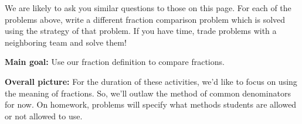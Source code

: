 \documentclass[nooutcomes,noauthor]{ximera}
\begin{document}
\begin{problem}
We are likely to ask you similar questions to those on this page. For each of the problems above, write a different fraction comparison problem which is solved using the strategy of that problem. If you have time, trade problems with a neighboring team and solve them!
\end{problem}





\newpage

\begin{instructorNotes} 



{\bf Main goal:} Use our fraction definition to compare fractions.

{\bf Overall picture:} For the duration of these activities, we'd like to focus on using the meaning of fractions. So, we'll outlaw  the method of common denominators for now. On homework, problems will specify what methods students are allowed or not allowed to use.





\end{instructorNotes}
\end{document}
